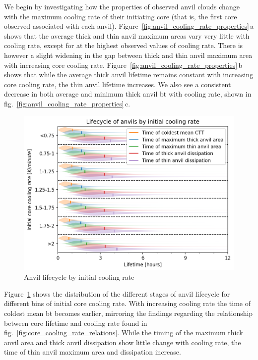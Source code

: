 We begin by investigating how the properties of observed anvil clouds change with the maximum cooling rate of their initiating core (that is, the first core observed associated with each anvil).
Figure~\ref{fig:anvil_cooling_rate_properties}\,a shows that the average thick and thin anvil maximum areas vary very little with cooling rate, except for at the highest observed values of cooling rate.
There is however a slight widening in the gap between thick and thin anvil maximum area with increasing core cooling rate.
Figure~\ref{fig:anvil_cooling_rate_properties}\,b shows that while the average thick anvil lifetime remains constant with increasing core cooling rate, the thin anvil lifetime increases.
We also see a consistent decrease in both average and minimum thick anvil \acrshort{bt} with cooling rate, shown in fig.~\ref{fig:anvil_cooling_rate_properties}\,c.


\begin{figure}[tp]
    \centering
    \includegraphics[width=\textwidth]{figures/ch2_22.png}
    \caption{Anvil lifecycle by initial cooling rate}
    \label{fig:anvil_cooling_rate_lifecycle}
\end{figure}

Figure~\ref{fig:anvil_cooling_rate_lifecycle} shows the distribution of the different stages of anvil lifecycle for different bins of initial core cooling rate.
With increasing cooling rate the time of coldest mean \acrshort{bt} becomes earlier, mirroring the findings regarding the relationship between core lifetime and cooling rate found in fig.~\ref{fig:core_cooling_rate_relations}.
While the timing of the maximum thick anvil area and thick anvil dissipation show little change with cooling rate, the time of thin anvil maximum area and dissipation increase.


